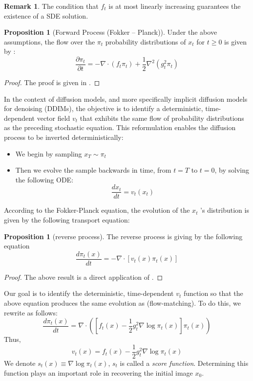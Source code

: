 \documentclass[a4paper,10pt]{article}
\theoremstyle{definition} %
\theoremstyle{definition} %
\newtheorem{proposition}[definition]{Proposition}
\theoremstyle{definition} %
\theoremstyle{definition} %
\newtheorem{remark}[definition]{Remark}
\newcommand{\0}{\boldsymbol{0}}
\begin{document}
    \begin{remark}
        The condition that $f_t$ is at most linearly increasing guarantees the existence of a SDE solution.
    \end{remark}

\begin{proposition}[Forward Process (Fokker – Planck)\label{prop:fokker}] 
    Under the above assumptions, the flow over the $\pi_t$ probability distributions of $x_t$ for $t \geq 0$ is given by :    \begin{equation}\label{eq:Fokker-Planck}
        \frac{\partial\pi_t}{\partial t} = -\nabla \cdot (f_t \pi_t) + \frac{1}{2}\nabla^2(g_t^2\pi_t)
    \end{equation}
\end{proposition}
\begin{proof}
    The proof is given in .
\end{proof}
In the context of diffusion models, and more specifically implicit diffusion models for denoising (DDIMs), the objective is to identify a deterministic, time-dependent vector field $v_t$ that exhibits the same flow of probability distributions as the preceding stochastic equation. This reformulation enables the diffusion process to be inverted deterministically:
\begin{itemize}
    \item We begin by sampling $x_T \sim \pi_t$
    \item Then we evolve the sample backwards in time, from $t=T$ to $t = 0$, by solving the following ODE:
    \begin{equation}
        \frac{dx_t}{dt} = v_t(x_t)
    \end{equation}
\end{itemize}
According to the Fokker-Planck equation, the evolution of the $x_t$ 's distribution is given by the following transport equation:
\begin{proposition}[reverse process\label{prop:fokker}] 
The reverse process is giving by the following equation
\[\frac{d\pi_t(x)}{dt} =-\nabla \cdot [v_t(x)\pi_t(x)]\]
\end{proposition}
\begin{proof}
    The above result is a direct application of .
\end{proof}
Our goal is to identify the deterministic, time-dependent $v_t$ function so that the above equation produces the same evolution as  (flow-matching). To do this, we rewrite  as follows:
\[\frac{d\pi_t(x)}{dt} =\nabla \cdot([f_t(x)-\frac{1}{2}g_t^2\nabla \log\pi_t(x)]\pi_t(x))\]
Thus,
\[v_t(x) =f_t(x)-\frac{1}{2}g_t^2\nabla \log\pi_t(x) \]
We denote $s_t(x) \equiv \nabla \log\pi_t(x)$, $s_t$ is called a \emph{score function}. Determining this function plays an important role in recovering the initial image $x_0$.
\end{document}
